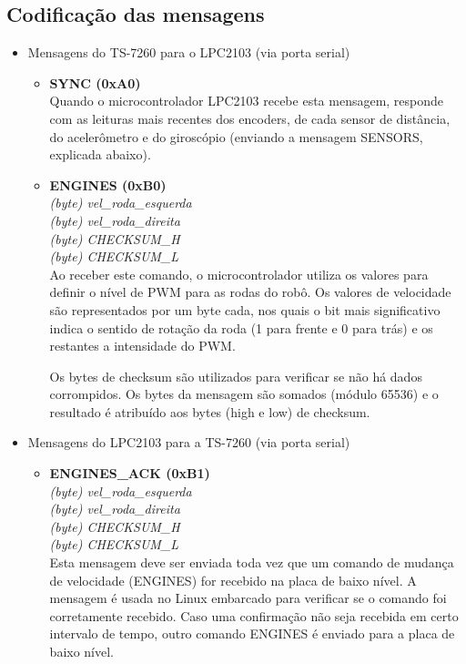 \subsection{Codificação das mensagens}
\label{sec:codificacao_mensagens}

\begin{itemize}
  \item Mensagens do TS-7260 para o LPC2103 (via porta serial)
    	
	\begin{itemize}
		
	  \item \textbf{SYNC (0xA0)}\\
	  Quando o microcontrolador LPC2103 recebe esta mensagem, responde com as leituras mais recentes dos encoders, de cada sensor de distância, do acelerômetro e do giroscópio (enviando a mensagem SENSORS, explicada abaixo).
	  
	  \item \textbf{ENGINES (0xB0)}\\
	  \textit{(byte) vel\_roda\_esquerda}\\
	  \textit{(byte) vel\_roda\_direita}\\
	  \textit{(byte) CHECKSUM\_H}\\
	  \textit{(byte) CHECKSUM\_L}\\
	  Ao receber este comando, o microcontrolador utiliza os valores para definir o nível de PWM para as rodas do robô. Os valores de velocidade são representados por um byte cada, nos quais o bit mais significativo indica o sentido de rotação da roda (1 para frente e 0 para trás) e os restantes a intensidade do PWM.
	  
	  Os bytes de checksum são utilizados para verificar se não há dados corrompidos. Os bytes da mensagem são somados (módulo 65536) e o resultado é atribuído aos bytes (high e low) de checksum.
	  \end{itemize}
	  
	  \item Mensagens do LPC2103 para a TS-7260 (via porta serial)
	  
	  \begin{itemize}

	  \item \textbf{ENGINES\_ACK (0xB1)}\\
	  \textit{(byte) vel\_roda\_esquerda}\\
	  \textit{(byte) vel\_roda\_direita}\\
	  \textit{(byte) CHECKSUM\_H}\\
	  \textit{(byte) CHECKSUM\_L}\\
	  Esta mensagem deve ser enviada toda vez que um comando de mudança de velocidade (ENGINES) for recebido na placa de baixo nível. A mensagem é usada no Linux embarcado para verificar se o comando foi corretamente recebido. Caso uma confirmação não seja recebida em certo intervalo de tempo, outro comando ENGINES é enviado para a placa de baixo nível.
	 

\end{itemize}
\end{itemize}

